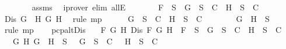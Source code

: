 \begin{isabellebody}
\ \ \ \ \ \ \isamarkupfalse%
\ assms\ \isamarkupfalse%
\ {\isacharparenleft}iprover\ elim{\isacharcolon}\ allE{\isacharparenright}\isanewline
\ \ \ \ \isamarkupfalse%
\ \isamarkupfalse%
\ {\isachardoublequoteopen}{\isacharquery}F\ {\isasymin}\ S\ {\isasymlongrightarrow}\ {\isacharbraceleft}\isactrlbold {\isasymnot}G{\isacharbraceright}\ {\isasymunion}\ S\ {\isasymin}\ C\ {\isasymor}\ {\isacharbraceleft}H{\isacharbraceright}\ {\isasymunion}\ S\ {\isasymin}\ C{\isachardoublequoteclose}\isanewline
\ \ \ \ \ \ \isamarkupfalse%
\ {\isacartoucheopen}Dis\ {\isacharparenleft}G\ \isactrlbold {\isasymrightarrow}\ H{\isacharparenright}\ {\isacharparenleft}\isactrlbold {\isasymnot}G{\isacharparenright}\ H{\isacartoucheclose}\ \isamarkupfalse%
\ {\isacharparenleft}rule\ mp{\isacharparenright}\isanewline
\ \ \ \ \isamarkupfalse%
\ {\isachardoublequoteopen}{\isacharbraceleft}\isactrlbold {\isasymnot}G{\isacharbraceright}\ {\isasymunion}\ S\ {\isasymin}\ C\ {\isasymor}\ {\isacharbraceleft}H{\isacharbraceright}\ {\isasymunion}\ S\ {\isasymin}\ C{\isachardoublequoteclose}\isanewline
\ \ \ \ \ \ \isamarkupfalse%
\ {\isacartoucheopen}{\isacharparenleft}G\ \isactrlbold {\isasymrightarrow}\ H{\isacharparenright}\ {\isasymin}\ S{\isacartoucheclose}\ \isamarkupfalse%
\ {\isacharparenleft}rule\ mp{\isacharparenright}\isanewline
\ \ \isamarkupfalse%
\isanewline
{}\isamarkupfalse%
%
\endisatagproof
{\isafoldproof}%
%
\isadelimproof
\isanewline
%
\endisadelimproof
\isanewline
{}\isamarkupfalse%
\ pcp{\isacharunderscore}alt{}Dis{}{\isacharcolon}\isanewline
\ \ \ {\isachardoublequoteopen}{\isasymforall}F\ G\ H{\isachardot}\ Dis\ F\ G\ H\ {\isasymlongrightarrow}\ F\ {\isasymin}\ S\ {\isasymlongrightarrow}\ {\isacharbraceleft}G{\isacharbraceright}\ {\isasymunion}\ S\ {\isasymin}\ C\ {\isasymor}\ {\isacharbraceleft}H{\isacharbraceright}\ {\isasymunion}\ S\ {\isasymin}\ C{\isachardoublequoteclose}\isanewline
\ \ \ {\isachardoublequoteopen}{\isasymforall}G\ H{\isachardot}\ \isactrlbold {\isasymnot}{\isacharparenleft}G\ \isactrlbold {\isasymand}\ H{\isacharparenright}\ {\isasymin}\ S\ {\isasymlongrightarrow}\ {\isacharbraceleft}\isactrlbold {\isasymnot}\ G{\isacharbraceright}\ {\isasymunion}\ S\ {\isasymin}\ C\ {\isasymor}\ {\isacharbraceleft}\isactrlbold {\isasymnot}\ H{\isacharbraceright}\ {\isasymunion}\ S\ {\isasymin}\ C{\isachardoublequoteclose}\isanewline

\end{isabellebody}
